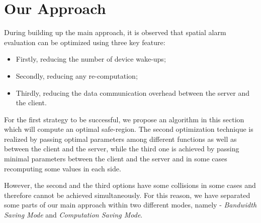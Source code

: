 \documentclass{sig-alternate}
\begin{document}
\section{Our Approach}
During building up the main approach, it is observed that spatial alarm evaluation can be optimized using three key feature: 
\begin{itemize}
\setlength\itemsep{0em}
\item Firstly, reducing the number of device wake-ups;
\item Secondly, reducing any re-computation;
\item Thirdly, reducing the data communication overhead between the server and the client.
\end{itemize}

For the first strategy to be successful, we propose an algorithm in this section which will compute an optimal safe-region. The second optimization technique is realized by passing optimal parameters among different functions as well as between the client and the server, while the third one is achieved by passing minimal parameters between the client and the server and in some cases recomputing some values in each side.

However, the second and the third options have some collisions in some cases and therefore cannot be achieved simultaneously. For this reason, we have separated some parts of our main approach within two different modes, namely - \textit{Bandwidth Saving Mode} and \textit{Computation Saving Mode}.
\end{document}
